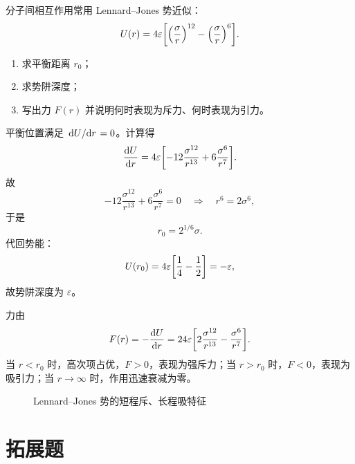 \begin{university}
分子间相互作用常用 Lennard--Jones 势近似：
\[
U(r)=4\varepsilon\qty[\qty(\frac{\sigma}{r})^{12}-\qty(\frac{\sigma}{r})^6].
\]
\begin{enumerate}
  \item 求平衡距离 $r_0$；
  \item 求势阱深度；
  \item 写出力 $F(r)$ 并说明何时表现为斥力、何时表现为引力。
\end{enumerate}
\begin{solution}
平衡位置满足 $\dv*{U}{r}=0$。计算得
\[
\dv{U}{r}=4\varepsilon\qty[-12\frac{\sigma^{12}}{r^{13}}+6\frac{\sigma^6}{r^7}].
\]
故
\[
-12\frac{\sigma^{12}}{r^{13}}+6\frac{\sigma^6}{r^7}=0
\quad\Longrightarrow\quad
r^6=2\sigma^6,
\]
于是
\[
r_0=2^{1/6}\sigma.
\]
代回势能：
\[
U(r_0)=4\varepsilon\qty[\frac{1}{4}-\frac{1}{2}]=-\varepsilon,
\]
故势阱深度为 $\varepsilon$。

力由
\[
F(r)=-\dv{U}{r}=24\varepsilon\qty[2\frac{\sigma^{12}}{r^{13}}-\frac{\sigma^6}{r^7}].
\]
当 $r<r_0$ 时，高次项占优，$F>0$，表现为强斥力；当 $r>r_0$ 时，$F<0$，表现为吸引力；当 $r\to \infty$ 时，作用迅速衰减为零。

\begin{figure}[H]
\centering
{}
\caption{Lennard--Jones 势的短程斥、长程吸特征}
\end{figure}
\end{solution}
\end{university}

\section{拓展题}

